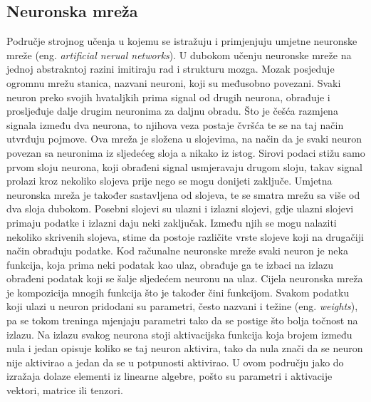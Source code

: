 \subsection{Neuronska mreža}
Područje strojnog učenja u kojemu se istražuju i primjenjuju umjetne neuronske mreže (eng. \textit{artificial nerual networks}). U dubokom učenju neuronske mreže na jednoj abstrakntoj razini imitiraju rad i strukturu mozga. Mozak posjeduje ogromnu mrežu stanica, nazvani neuroni, koji su međusobno povezani. Svaki neuron preko svojih hvataljkih prima signal od drugih neurona, obrađuje i prosljeđuje dalje drugim neuronima za daljnu obradu. Što je češća razmjena signala između dva neurona, to njihova veza postaje čvršća te se na taj način utvrđuju pojmove. Ova mreža je složena u slojevima, na način da je svaki neuron povezan sa neuronima iz sljedećeg sloja a nikako iz istog. Sirovi podaci stižu samo prvom sloju neurona, koji obrađeni signal usmjeravaju drugom sloju, takav signal prolazi kroz nekoliko slojeva prije nego se mogu donijeti zaključe. Umjetna neuronska mreža je također sastavljena od slojeva, te se smatra mrežu sa više od dva sloja dubokom. Posebni slojevi su ulazni i izlazni slojevi, gdje ulazni slojevi primaju podatke i izlazni daju neki zaključak. Između njih se mogu nalaziti nekoliko skrivenih slojeva, stime da postoje različite vrste slojeve koji na drugačiji način obrađuju podatke. Kod računalne neuronske mreže svaki neuron je neka funkcija, koja prima neki podatak kao ulaz, obrađuje ga te izbaci na izlazu obrađeni podatak koji se šalje sljedećem neuronu na ulaz. Cijela neuronska mreža je kompozicija mnogih funkcija što je također čini funkcijom. Svakom podatku koji ulazi u neuron pridodani su parametri, često nazvani i težine (eng. \textit{weights}), pa se tokom treninga mjenjaju parametri tako da se postige što bolja točnost na izlazu. Na izlazu svakog neurona stoji aktivacijska funkcija koja brojem između nula i jedan opisuje koliko se taj neuron aktivira, tako da nula znači da se neuron nije aktivirao a jedan da se u potpunosti aktivirao. U ovom području jako do izražaja dolaze elementi iz linearne algebre, pošto su parametri i aktivacije vektori, matrice ili tenzori. 


